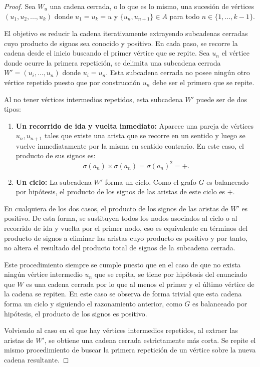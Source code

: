 \documentclass[11pt,a4paper,spanish]{report}
\theoremstyle{plain}
\begin{document}
\begin{proof}
Sea $W_u$ una cadena cerrada, o lo que es lo mismo, una sucesión de vértices $(u_1, u_2,...,u_k)$ donde $u_1=u_k=u$ y $\{u_n, u_{n+1}\} \in A$ para todo $n \in \{1,...,k-1\}$. 

El objetivo es reducir la cadena iterativamente extrayendo subcadenas cerradas cuyo producto de signos sea conocido y positivo. En cada paso, se recorre la cadena desde el inicio buscando el primer vértice que se repite. Sea $u_n$ el vértice donde ocurre la primera repetición, se delimita una subcadena cerrada $W' = (u_i, \ldots, u_n)$ donde $u_i = u_n$. Esta subcadena cerrada no posee ningún otro vértice repetido puesto que por construcción $u_n$ debe ser el primero que se repite.

Al no tener vértices intermedios repetidos, esta subcadena $W'$ puede ser de dos tipos:
\begin{enumerate}
    \item [(i)] \textbf{Un recorrido de ida y vuelta inmediato:} Aparece una pareja de vértices $u_n, u_{n+1}$ tales que existe una arista que se recorre en un sentido y luego se vuelve inmediatamente por la misma en sentido contrario. En este caso, el producto de sus signos es:
    \[
    \sigma(a_n)\times\sigma(a_{n}) = \sigma(a_n)^2 = +.
    \]
    \item[(ii)] \textbf{Un ciclo:} La subcadena $W'$ forma un ciclo. Como el grafo $G$ es balanceado por hipótesis, el producto de los signos de las aristas de este ciclo es $+$.
\end{enumerate}


En cualquiera de los dos casos, el producto de los signos de las aristas de $W'$ es positivo. De esta forma, se sustituyen todos los nodos asociados al ciclo o al recorrido de ida y vuelta por el primer nodo, eso es equivalente en términos del producto de signos a eliminar las aristas cuyo producto es positivo y por tanto, no altera el resultado del producto total de signos de la subcadena cerrada. 

Este procedimiento siempre se cumple puesto que en el caso de que no exista ningún vértice intermedio $u_n$ que se repita, se tiene por hipótesis del enunciado que $W$ es una cadena cerrada por lo que al menos el primer y el último vértice de la cadena se repiten. En este caso se observa de forma trivial que esta cadena forma un ciclo y siguiendo el razonamiento anterior, como $G$ es balanceado por hipótesis, el producto de los signos es positivo.

Volviendo al caso en el que hay vértices intermedios repetidos, al extraer las aristas de $W'$, se obtiene una cadena cerrada estrictamente más corta.  Se repite el mismo procedimiento de buscar la primera repetición de un vértice sobre la nueva cadena resultante. 

\end{proof}
\end{document}
